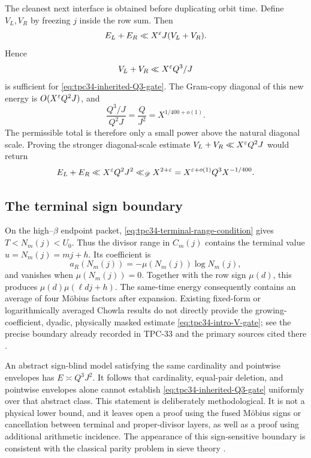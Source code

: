 The cleanest next interface is obtained before duplicating orbit time.
Define \(V_L,V_R\) by freezing \(j\) inside the row sum.  Then
\begin{equation}
 E_L+E_R\ll X^\varepsilon J(V_L+V_R).
 \label{eq:tpc34-intro-orbit-transfer}
\end{equation}
Hence
\begin{equation}
 V_L+V_R\ll X^\varepsilon Q^3/J
 \label{eq:tpc34-intro-V-gate}
\end{equation}
is sufficient for \eqref{eq:tpc34-inherited-Q3-gate}.  The Gram-copy diagonal of
this new energy is \(O(X^\varepsilon Q^2J)\), and
\begin{equation}
 \frac{Q^3/J}{Q^2J}=\frac{Q}{J^2}
 =X^{1/400+o(1)}.
 \label{eq:tpc34-intro-V-allowance}
\end{equation}
The permissible total is therefore only a small power above the natural
diagonal scale.  Proving the stronger diagonal-scale estimate
\(V_L+V_R\ll X^\varepsilon Q^2J\) would return
\[
 E_L+E_R
 \ll X^\varepsilon Q^2J^2
 \ll_{\mathscr D}X^{2+\varepsilon}
 =X^{\varepsilon+o(1)}Q^3X^{-1/400}.
\]

\subsection{The terminal sign boundary}

On the high--\(\beta\) endpoint packet,
\eqref{eq:tpc34-terminal-range-condition} gives
\(T<N_m(j)<U_0\).  Thus the divisor range in \(C_m(j)\) contains the
terminal value \(u=N_m(j)=mj+h\).  Its coefficient is
\begin{equation}
 a_R(N_m(j))=-\mu(N_m(j))\log N_m(j),
 \label{eq:tpc34-intro-terminal}
\end{equation}
and vanishes when \(\mu(N_m(j))=0\).  Together with the row sign \(\mu(d)\), this produces
\(\mu(d)\mu(\ell dj+h)\).  The same-time energy consequently contains an
average of four M\"obius factors after expansion.  Existing fixed-form or
logarithmically averaged Chowla results do not directly provide the
growing-coefficient, dyadic, physically masked estimate
\eqref{eq:tpc34-intro-V-gate}; see the precise boundary already recorded
in TPC-33 and the primary sources cited there
\citep{Tao2016LogChowla,MatomakiRadziwillTao2015,WangTPC33}.

An abstract sign-blind model satisfying the same cardinality and
pointwise envelopes has \(E\asymp Q^3J^2\).  It follows that cardinality,
equal-pair deletion, and pointwise envelopes alone cannot establish
\eqref{eq:tpc34-inherited-Q3-gate} uniformly over that abstract class.
This statement is deliberately methodological.  It is not a physical
lower bound, and it leaves open a proof using the fused M\"obius signs or
cancellation between terminal and proper-divisor layers, as well as a
proof using additional arithmetic incidence.  The appearance of this
sign-sensitive boundary is consistent with the classical parity problem
in sieve theory \citep{HeathBrown1982Parity}.


